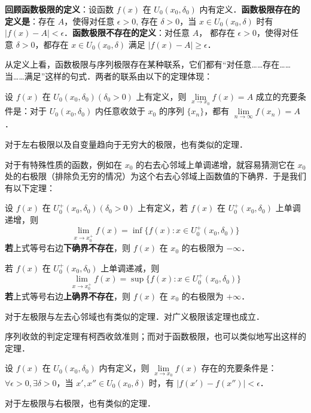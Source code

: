 \textbf{回顾函数极限的定义}：设函数 $f(x)$ 在 $U_0(x_0,\delta_0)$ 内有定义．\textbf{函数极限存在的定义是}：存在 $A$，使得对任意 $\epsilon >0$, 存在 $\delta>0$，当 $x\in U_0(x_0,\delta)$ 时有 $|f(x)-A|<\epsilon$．\textbf{函数极限不存在的定义}：对任意 $A$， 都存在 $\epsilon>0$，使得对任意 $\delta>0$，都存在 $x\in U_0(x_0,\delta)$ 满足 $|f(x)-A|\ge \epsilon$．

从定义上看，函数极限与序列极限存在某种联系，它们都有“对任意……存在……当……满足”这样的句式．两者的联系由以下的定理体现：

\begin{theorem}{}
设 $f(x)$ 在 $U_0(x_0,\delta_0)(\delta_0>0)$ 上有定义，则 $\lim\limits_{x\rightarrow x_0}f(x)=A$ 成立的充要条件是：对于 $U_0(x_0,\delta_0)$ 内任意收敛于 $x_0$ 的序列 $\{x_n\}$，都有 $\lim\limits_{n\rightarrow \infty}f(x_n)=A$．

对于左右极限以及自变量趋向于无穷大的极限，也有类似的定理．
\end{theorem}

对于有特殊性质的函数，例如在 $x_0$ 的右去心邻域上单调递增，就容易猜测它在 $x_0$ 处的右极限（排除负无穷的情况）为这个右去心邻域上函数值的下确界．于是我们有以下定理：
\begin{theorem}{}
设 $f(x)$ 在 $U_0^+(x_0,\delta_0)(\delta_0>0)$ 上有定义，若 $f(x)$ 在  $U_0^+(x_0,\delta_0)$ 上单调递增，则
\begin{equation}
  \lim\limits_{x\rightarrow x_0^+}f(x)=\inf\{f(x):x\in U_0^+(x_0,\delta_0)\}
\end{equation}
\textbf{若}上式等号右边\textbf{下确界不存在}，则 $f(x)$ 在 $x_0$ 的右极限为 $-\infty$．

若 $f(x)$ 在  $U_0^+(x_0,\delta_0)$ 上单调递减，则
\begin{equation}
\lim\limits_{x\rightarrow x_0^+}f(x)=\sup\{f(x):x\in U_0^+(x_0,\delta_0)\}
\end{equation}
\textbf{若}上式等号右边\textbf{上确界不存在}，则 $f(x)$ 在 $x_0$ 的右极限为 $+\infty$．

对于左极限与左去心邻域也有类似的定理．对广义极限该定理也成立．
\end{theorem}

序列收敛的判定定理有柯西收敛准则；而对于函数极限，也可以类似地写出这样的定理．
\begin{theorem}{}
设 $f(x)$ 在 $U_0(x_0,\delta_0)$ 内有定义，则 $\lim\limits_{x\rightarrow x_0}f(x)$ 存在的充要条件是： $\forall \epsilon>0,\exists\delta>0$，当 $x',x''\in U_0(x_0,\delta)$ 时，有 $|f(x')-f(x'')|<\epsilon$．

对于左极限与右极限，也有类似的定理．
\end{theorem}

